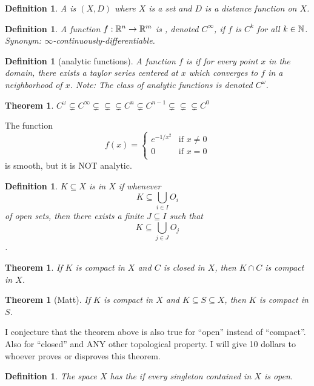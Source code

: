 \documentclass[11pt]{amsbook}
\theoremstyle{mystyle} \newtheorem{thrm}[thm]{Theorem}
\theoremstyle{mystyle} \newtheorem{defi}[thm]{Definition}
\theoremstyle{mystyle} \newtheorem{coro}[thm]{Corollary}
\theoremstyle{mystyle} \newtheorem{propo}[thm]{Proposition}
\theoremstyle{mystyle} \newtheorem{lemm}[thm]{Lemma}
\numberwithin{thm}{section}
\begin{document}
\begin{defi}
	A  is $(X, D)$ where $X$ is a set and $D$ is a distance function on $X$.
\end{defi}
\begin{defi}
	A function $f:{\mathbb R}^n \to {\mathbb R}^m$ is , denoted $C^\infty$, if $f$ is $C^k$ for all $k \in {\mathbb N}$.
	Synonym: $\infty$-continuously-differentiable.
\end{defi}
\begin{defi}[analytic functions]
	A function $f$ is  if for every point $x$ in the domain, there exists a taylor series centered at $x$ which converges to $f$ in a neighborhood of $x$.  Note: The class of analytic functions is denoted $C^\omega$.
\end{defi}
\begin{thrm}
	$C^\omega \subsetneq C^\infty \subsetneq \subsetneq \subsetneq C^n \subsetneq C^{n-1} \subsetneq \subsetneq \subsetneq C^0$
\end{thrm}
\begin{example}
	The function $$f(x) =
	\begin{cases}
		e^{-1/x^2}	&\text{if $x \neq 0$} \\
		0			&\text{if $x=0$} \\
	\end{cases}
	$$
	is smooth, but it is NOT analytic.
\end{example}
\begin{defi}
	$K \subseteq X$ is  in $X$ if whenever $${K \subseteq \bigcup_{i \in I} O_i}$$ of open sets, then there exists a finite $J \subseteq I$ such that $$K \subseteq \bigcup_{j \in J} O_j$$.
\end{defi}
\begin{thrm}
	If $K$ is compact in $X$ and $C$ is closed in $X$, then $K \cap C$ is compact in $X$.
\end{thrm}
\begin{thrm}[Matt]
	If $K$ is compact in $X$ and $K \subseteq S \subseteq X$, then $K$ is compact in $S$.
\end{thrm}
\begin{conj}[Matt]
	I conjecture that the theorem above is also true for ``open'' instead of ``compact''.  Also for ``closed'' and ANY other topological property.  I will give 10 dollars to whoever proves or disproves this theorem.
\end{conj}
\begin{defi}
	The space $X$ has the  if every singleton contained in $X$ is open.
\end{defi}
\end{document}
